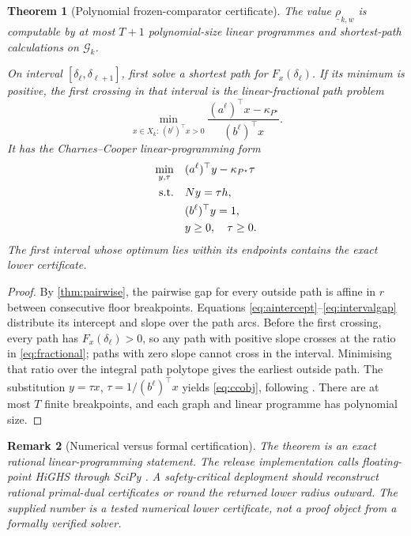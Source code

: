 \documentclass[11pt]{article}
\newtheorem{theorem}{Theorem}[section]
\newtheorem{remark}[theorem]{Remark}
\theoremstyle{definition}
\newcommand{\cG}{\mathcal{G}}
\begin{document}
\begin{theorem}[Polynomial frozen-comparator certificate]\label{thm:polynomial}
The value $\underline\rho_{k,w}$ is computable by at most $T+1$ polynomial-size linear programmes and shortest-path calculations on $\cG_k$.

On interval $[\delta_\ell,\delta_{\ell+1}]$, first solve a shortest path for $F_x(\delta_\ell)$. If its minimum is positive, the first crossing in that interval is the linear-fractional path problem
\begin{equation}\label{eq:fractional}
\min_{x\in X_k:\,(b^\ell)^\top x>0}
\frac{(a^\ell)^\top x-\kappa_{P^\star}}{(b^\ell)^\top x}.
\end{equation}
It has the Charnes--Cooper linear-programming form
\begin{align}
\min_{y,\tau}\quad &(a^\ell)^\top y-\kappa_{P^\star}\tau\label{eq:ccobj}\\
\text{s.t.}\quad &Ny=\tau h,\notag\\
&(b^\ell)^\top y=1,\notag\\
&y\ge0,\quad\tau\ge0.\notag
\end{align}
The first interval whose optimum lies within its endpoints contains the exact lower certificate.
\end{theorem}

\begin{proof}
By \cref{thm:pairwise}, the pairwise gap for every outside path is affine in $r$ between consecutive floor breakpoints. Equations \eqref{eq:aintercept}--\eqref{eq:intervalgap} distribute its intercept and slope over the path arcs. Before the first crossing, every path has $F_x(\delta_\ell)>0$, so any path with positive slope crosses at the ratio in \eqref{eq:fractional}; paths with zero slope cannot cross in the interval. Minimising that ratio over the integral path polytope gives the earliest outside path. The substitution $y=\tau x$, $\tau=1/(b^\ell)^\top x$ yields \eqref{eq:ccobj}, following \textcite{CharnesCooper1962}. There are at most $T$ finite breakpoints, and each graph and linear programme has polynomial size.
\end{proof}

\begin{remark}[Numerical versus formal certification]
The theorem is an exact rational linear-programming statement. The release implementation calls floating-point HiGHS through SciPy \parencite{HuangfuHall2018,VirtanenEtAl2020}. A safety-critical deployment should reconstruct rational primal-dual certificates or round the returned lower radius outward. The supplied number is a tested numerical lower certificate, not a proof object from a formally verified solver.
\end{remark}
\end{document}
